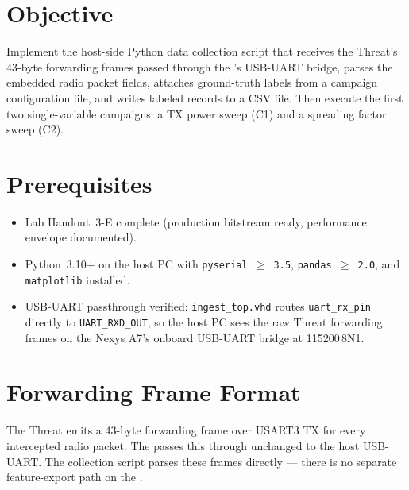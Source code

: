 \documentclass[11pt,letterpaper]{article}
\begin{document}

\section{Objective}
Implement the host-side Python data collection script that receives the Threat's 43-byte forwarding frames passed through the \FPGA{}'s \mbox{USB-UART} bridge, parses the embedded radio packet fields, attaches ground-truth labels from a campaign configuration file, and writes labeled records to a \mbox{CSV} file. Then execute the first two single-variable campaigns: a \mbox{TX} power sweep (C1) and a spreading factor sweep (C2).

\section{Prerequisites}
\begin{itemize}[leftmargin=2em]
	\item Lab Handout~3-E complete (production bitstream ready, performance envelope documented).
	\item Python~3.10+ on the host PC with \texttt{pyserial $\geq$ 3.5}, \texttt{pandas $\geq$ 2.0}, and \texttt{matplotlib} installed.
	\item \FPGA{} \mbox{USB-UART} passthrough verified: \texttt{ingest\_top.vhd} routes \texttt{uart\_rx\_pin} directly to \texttt{UART\_RXD\_OUT}, so the host PC sees the raw Threat forwarding frames on the Nexys A7's onboard \mbox{USB-UART} bridge at 115200\,8N1.
\end{itemize}

\section{Forwarding Frame Format}
The Threat emits a 43-byte forwarding frame over \mbox{USART3} TX for every intercepted radio packet. The \FPGA{} passes this through unchanged to the host \mbox{USB-UART}. The collection script parses these frames directly --- there is no separate feature-export path on the \FPGA{}.
\end{document}
